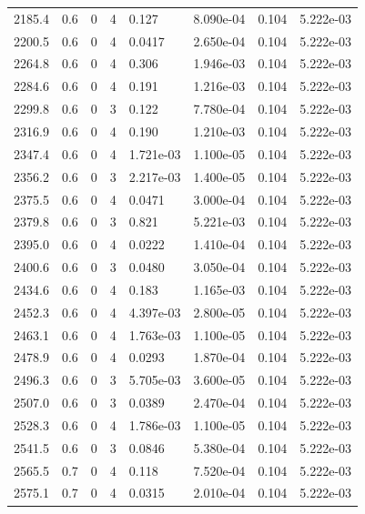 \documentclass[preview]{standalone}
\begin{document}
{{{{{\begin{tabular}{L{1.2cm}C{1.2cm} C{0.3cm}C{0.5cm} C{1.4cm}C{1.4cm} C{1.4cm}C{1.4cm}}
  2185.4  &   0.6  & 0     &  4 &  0.127  & 8.090e-04  & 0.104 &  5.222e-03   \\ 
  2200.5  &   0.6  & 0     &  4 &  0.0417  & 2.650e-04  & 0.104 &  5.222e-03   \\ 
  2264.8  &   0.6  & 0     &  4 &  0.306  & 1.946e-03  & 0.104 &  5.222e-03   \\ 
  2284.6  &   0.6  & 0     &  4 &  0.191  & 1.216e-03  & 0.104 &  5.222e-03   \\ 
  2299.8  &   0.6  & 0     &  3 &  0.122  & 7.780e-04  & 0.104 &  5.222e-03   \\ 
  2316.9  &   0.6  & 0     &  4 &  0.190  & 1.210e-03  & 0.104 &  5.222e-03   \\ 
  2347.4  &   0.6  & 0     &  4 &  1.721e-03  & 1.100e-05  & 0.104 &  5.222e-03   \\ 
  2356.2  &   0.6  & 0     &  3 &  2.217e-03  & 1.400e-05  & 0.104 &  5.222e-03   \\ 
  2375.5  &   0.6  & 0     &  4 &  0.0471  & 3.000e-04  & 0.104 &  5.222e-03   \\ 
  2379.8  &   0.6  & 0     &  3 &  0.821  & 5.221e-03  & 0.104 &  5.222e-03   \\ 
  2395.0  &   0.6  & 0     &  4 &  0.0222  & 1.410e-04  & 0.104 &  5.222e-03   \\ 
  2400.6  &   0.6  & 0     &  3 &  0.0480  & 3.050e-04  & 0.104 &  5.222e-03   \\ 
  2434.6  &   0.6  & 0     &  4 &  0.183  & 1.165e-03  & 0.104 &  5.222e-03   \\ 
  2452.3  &   0.6  & 0     &  4 &  4.397e-03  & 2.800e-05  & 0.104 &  5.222e-03   \\ 
  2463.1  &   0.6  & 0     &  4 &  1.763e-03  & 1.100e-05  & 0.104 &  5.222e-03   \\ 
  2478.9  &   0.6  & 0     &  4 &  0.0293  & 1.870e-04  & 0.104 &  5.222e-03   \\ 
  2496.3  &   0.6  & 0     &  3 &  5.705e-03  & 3.600e-05  & 0.104 &  5.222e-03   \\ 
  2507.0  &   0.6  & 0     &  3 &  0.0389  & 2.470e-04  & 0.104 &  5.222e-03   \\ 
  2528.3  &   0.6  & 0     &  4 &  1.786e-03  & 1.100e-05  & 0.104 &  5.222e-03   \\ 
  2541.5  &   0.6  & 0     &  3 &  0.0846  & 5.380e-04  & 0.104 &  5.222e-03   \\ 
  2565.5  &   0.7  & 0     &  4 &  0.118  & 7.520e-04  & 0.104 &  5.222e-03   \\ 
  2575.1  &   0.7  & 0     &  4 &  0.0315  & 2.010e-04  & 0.104 &  5.222e-03   \\ 

\end{tabular}}}}}}
\end{document}
